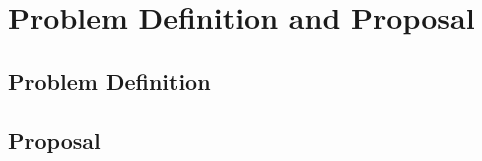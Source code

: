 \chapter{Problem Definition and Proposal}
\label{problem_definition_and_proposal}

\section{Problem Definition}

\section{Proposal}



